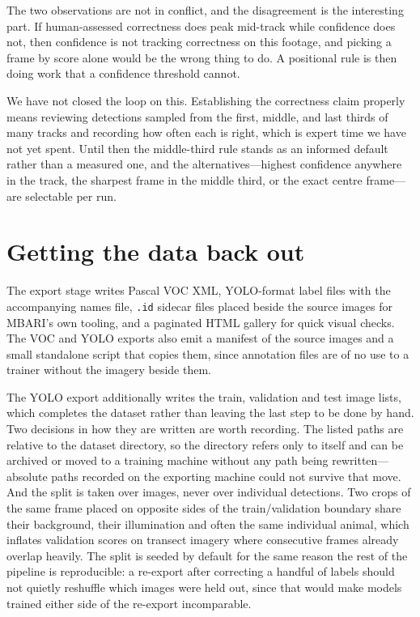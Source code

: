 \documentclass[10pt,letterpaper]{article}
\newcommand{\code}[1]{\texttt{\small #1}}
\begin{document}
The two observations are not in conflict, and the disagreement is the
interesting part. If human-assessed correctness does peak mid-track while
confidence does not, then confidence is not tracking correctness on this
footage, and picking a frame by score alone would be the wrong thing to do. A
positional rule is then doing work that a confidence threshold cannot.

We have not closed the loop on this. Establishing the correctness claim properly
means reviewing detections sampled from the first, middle, and last thirds of
many tracks and recording how often each is right, which is expert time we have
not yet spent. Until then the middle-third rule stands as an informed default
rather than a measured one, and the alternatives---highest confidence anywhere
in the track, the sharpest frame in the middle third, or the exact centre
frame---are selectable per run.

\section{Getting the data back out}

The export stage writes Pascal VOC XML, YOLO-format label files with the
accompanying names file, \code{*.id} sidecar files placed beside the source
images for MBARI's own tooling, and a paginated HTML gallery for quick visual
checks. The VOC and YOLO exports also emit a manifest of the source images and a
small standalone script that copies them, since annotation files are of no use
to a trainer without the imagery beside them.

The YOLO export additionally writes the train, validation and test image lists,
which completes the dataset rather than leaving the last step to be done by
hand. Two decisions in how they are written are worth recording. The listed
paths are relative to the dataset directory, so the directory refers only to
itself and can be archived or moved to a training machine without any path
being rewritten---absolute paths recorded on the exporting machine could not
survive that move. And the split is taken over images, never over individual
detections. Two crops of the same frame placed on opposite sides of the
train/validation boundary share their background, their illumination and often
the same individual animal, which inflates validation scores on transect
imagery where consecutive frames already overlap heavily. The split is seeded
by default for the same reason the rest of the pipeline is reproducible: a
re-export after correcting a handful of labels should not quietly reshuffle
which images were held out, since that would make models trained either side
of the re-export incomparable.
\end{document}
